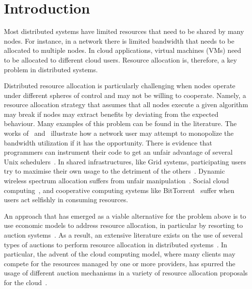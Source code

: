 

\section{Introduction}
\label{sec:introduction}

Most distributed systems have limited resources that need to be shared by many nodes. 
For instance, in a network there is limited bandwidth that needs to be allocated to multiple nodes. 
In cloud applications, virtual machines (VMs) need to be allocated to different cloud users. 
Resource allocation is, therefore, a key problem in distributed systems.

Distributed resource allocation is particularly challenging when nodes
operate under different spheres of control and may not be willing to cooperate. 
Namely, a resource allocation strategy that assumes that all nodes 
execute a given algorithm may break if nodes 
may extract benefits by deviating from the expected behaviour.
Many examples of this problem can be found in the literature. 
The works of~\cite{Lee2007} and~\cite{Xiao2013} illustrate how
a network user may attempt to monopolize the bandwidth utilization 
if it has the opportunity. 
There is evidence that programmers can instrument their code 
to get an unfair advantage of several Unix schedulers~\cite{Grosu2005}. 
In shared infrastructures, like Grid systems, participating
users try to maximise their own usage to the detriment of 
the others~\cite{Lai2004}.
Dynamic wireless spectrum allocation suffers from unfair manipulation~\cite{Zhou2008}.
Social cloud computing~\cite{Caton2014}, 
and cooperative computing systems like BitTorrent~\cite{Liu2010}
suffer when users act selfishly in consuming resources.


An approach that has emerged as a viable alternative for the problem
above is to use economic models to address resource allocation, in
particular by resorting to auction systems~\cite{Riley1981}. 
As a result, an extensive
literature exists on the use of several types of auctions to perform
resource allocation in distributed systems~\cite{Niyato2013, Lai2004, Waldspurger1992}. 
In particular, the advent of the cloud computing model, where many
clients may compete for the resources managed by one or more
providers, has spurred the usage of different auction mechanisms in a
variety of resource allocation proposals for the
cloud~\cite{Popa2012, Niu2012, Wang:12, 
Zhang:13, Shi:14, Zheng2014Star, Zhang:14, Zhang2015Truthful}.

